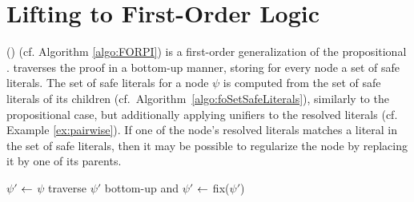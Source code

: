 \section{Lifting \RPI to First-Order Logic}
\label{sec:FORPI}
{\FirstOrderRPI} ({\FORPI}) (cf. Algorithm \ref{algo:FORPI}) is a first-order generalization of the propositional {\RPI}.
{\FORPI} traverses the proof in a bottom-up manner, storing for every node a set of safe literals. The set of safe literals for a node $\psi$ is computed from the set of safe literals of its children (cf.\ Algorithm~\ref{algo:foSetSafeLiterals}), similarly to the propositional case, but additionally applying unifiers to the resolved literals (cf. Example \ref{ex:pairwise}).
If one of the node's resolved literals matches a literal in the set of safe literals, then it may be possible to regularize the node by replacing it by one of its parents.  



\IncMargin{0.5em}
\begin{algorithm}[bt]
\begin{footnotesize}


\BlankLine

$\psi'$ $\leftarrow$ $\psi$\;
traverse $\psi'$ bottom-up and 
$\psi'$ $\leftarrow$ fix($\psi'$) \;
\;
\caption{\label{algo:FORPI} \texttt{\FORPI}}
\end{footnotesize}
\end{algorithm}
\DecMargin{0.5em}    


